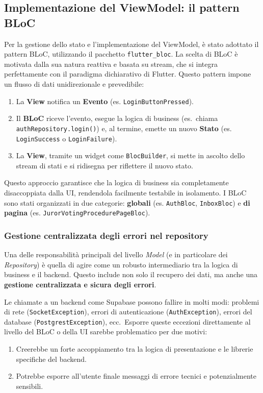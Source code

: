 \subsection{Implementazione del ViewModel: il pattern BLoC}\label{subsec:implementazione-del-viewmodel:-il-pattern-bloc}
Per la gestione dello stato e l'implementazione del ViewModel, è stato adottato il pattern BLoC, utilizzando il pacchetto \texttt{flutter\_bloc}.
La scelta di BLoC è motivata dalla sua natura reattiva e basata su stream, che si integra perfettamente con il paradigma dichiarativo di Flutter.
Questo pattern impone un flusso di dati unidirezionale e prevedibile:
\begin{enumerate}
    \item La \textbf{View} notifica un \textbf{Evento} (es. \texttt{LoginButtonPressed}).
    \item Il \textbf{BLoC} riceve l'evento, esegue la logica di business (es.\ chiama \texttt{authRepository.login()}) e, al termine, emette un nuovo \textbf{Stato} (es. \texttt{LoginSuccess} o \texttt{LoginFailure}).
    \item La \textbf{View}, tramite un widget come \texttt{BlocBuilder}, si mette in ascolto dello stream di stati e si ridisegna per riflettere il nuovo stato.
\end{enumerate}
Questo approccio garantisce che la logica di business sia completamente disaccoppiata dalla UI, rendendola facilmente testabile in isolamento.
I BLoC sono stati organizzati in due categorie: \textbf{globali} (es. \texttt{AuthBloc}, \texttt{InboxBloc}) e \textbf{di pagina} (es. \texttt{JurorVotingProcedurePageBloc}).

\subsubsection{Gestione centralizzata degli errori nel repository}
Una delle responsabilità principali del livello \emph{Model} (e in particolare dei \emph{Repository}) è quella di agire come un robusto intermediario tra la logica di business e il backend.
Questo include non solo il recupero dei dati, ma anche una \textbf{gestione centralizzata e sicura degli errori}.

Le chiamate a un backend come Supabase possono fallire in molti modi: problemi di rete (\texttt{SocketException}), errori di autenticazione (\texttt{AuthException}), errori del database (\texttt{PostgrestException}), ecc.\ Esporre queste eccezioni direttamente al livello del BLoC o della UI sarebbe problematico per due motivi:
\begin{enumerate}
	\item Creerebbe un forte accoppiamento tra la logica di presentazione e le librerie specifiche del backend.
    \item Potrebbe esporre all'utente finale messaggi di errore tecnici e potenzialmente sensibili.
\end{enumerate}

